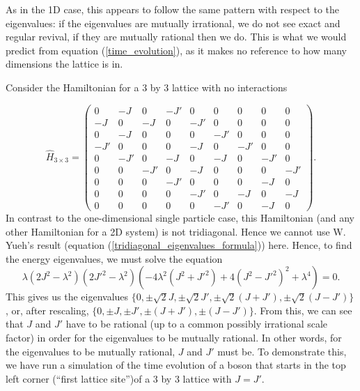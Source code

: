\documentclass[a4paper,10pt]{article}
\theoremstyle{plain}
\begin{document}
As in the 1D case, this appears to follow the same pattern with respect to the
eigenvalues: if the eigenvalues are mutually irrational, we do not see exact
and regular revival, if they are mutually rational then we do. This is what
we would predict from equation (\ref{time_evolution}), as it makes no 
reference to how many dimensions the lattice is in.

Consider the Hamiltonian for a $3$ by $3$ lattice with no interactions

\begin{equation}
    \hat{H}_{3\times3}
    =
    \begin{pmatrix}
         0& -J&  0& -J'&  0&  0&  0&  0&  0\\
 -J&  0& -J&  0& -J'&  0&  0&  0&  0\\
  0& -J&  0&  0&  0& -J'&  0&  0&  0\\
 -J'&  0&  0&  0& -J&  0& -J'&  0&  0\\
  0& -J'&  0& -J&  0& -J&  0& -J'&  0\\
  0&  0& -J'&  0& -J&  0&  0&  0& -J'\\
  0&  0&  0& -J'&  0&  0&  0& -J&  0\\
  0&  0&  0&  0& -J'&  0& -J&  0& -J\\
  0&  0&  0&  0&  0& -J'&  0& -J&  0

    \end{pmatrix}.
\end{equation}
In contrast to the one-dimensional single particle case, this Hamiltonian (and
any other Hamiltonian for a 2D system) is not tridiagonal. Hence we cannot use 
W. Yueh's result (equation (\ref{tridiagonal_eigenvalues_formula})) here.
Hence, to find the energy eigenvalues, we must solve the equation
\begin{equation}
 \lambda\left(2J^2-\lambda^2\right)
 \left(2J'^2-\lambda^2\right)
 \left(-4\lambda^2\left(J^2+J'^2\right)
 +
 4\left(J^2-J'^2\right)^2
 +
 \lambda^4\right)
 =
 0.
\end{equation}
This gives us the eigenvalues 
$\lbrace 
0,
\pm\sqrt{2}J,
\pm\sqrt{2}J',
\pm \sqrt{2}(J+J'),
\pm \sqrt{2}(J-J')
\rbrace$,
or, after rescaling,
$\lbrace 
0,
\pm J,
\pm J',
\pm (J+J'),
\pm (J-J')
\rbrace$. 
From this, we can see that $J$ and $J'$ have to be rational (up to a common 
possibly irrational scale factor) in order for the eigenvalues to be mutually
rational. In other words, for the eigenvalues to be mutually rational,
$J$ and $J'$ must be. To demonstrate this, we have run a simulation of the 
time evolution of a boson that starts in the top left corner (``first lattice 
site'')of a $3$ by $3$ lattice with $J=J'$. 
\end{document}
